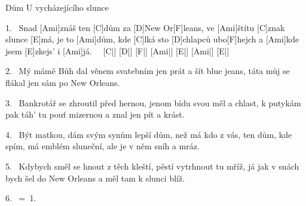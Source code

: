 \begin{song}{Dům U vycházejícího slunce}{}

\begin{xverse}{1.~}
Snad [Ami]znáš ten [C]dům za [D]New Or[F]leans,
ve [Ami]{}štítu [C]znak slunce [E]má,
je to [Ami]dům, kde [C]lká sto [D]chlapců ubo[F]hejch
a [Ami]kde jsem [E]zkejs' i [Ami]já. \ \  [C|]{} [D|]{} [F|]{} [Ami|]{} [E|]{} [Ami|]{} [E|]{}
\end{xverse}

\begin{xverse}{2.~}
Mý mámě Bůh dal věnem svatebním
jen prát a šít blue jeans,
táta můj se flákal jen
sám po New Orleans.
\end{xverse}

\begin{xverse}{3.~}
Bankrotář se zhroutil před hernou,
jenom bídu svou měl a chlast,
k putykám pak táh' tu pouť mizernou
a znal jen pít a krást.
\end{xverse}

\begin{xverse}{4.~}
Být matkou, dám svým synům
lepší dům, než má kdo z vás,
ten dům, kde spím, má emblém sluneční,
ale je v něm sníh a mráz.
\end{xverse}

\begin{xverse}{5.~}
Kdybych směl se hnout z těch kleští,
pěstí vytrhnout tu mříž,
já jak v snách bych šel do New Orleans
a měl tam k slunci blíž.
\end{xverse}

\begin{xverse}{6.~}
=\ 1.
\end{xverse}

\end{song}

